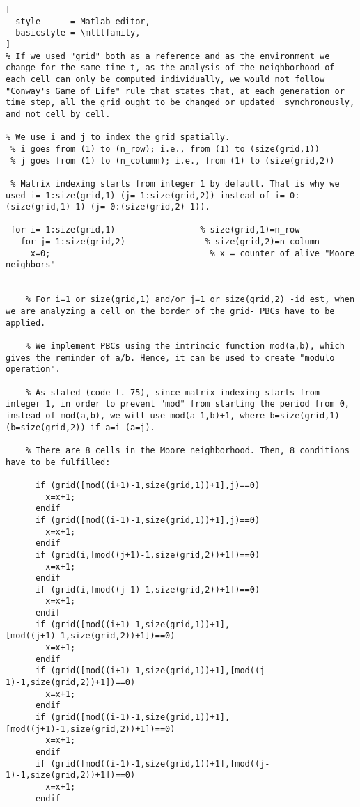 \documentclass[11pt]{article}
\numberwithin{equation}{section} %
\numberwithin{figure}{section} %
\begin{document}
\begin{appendices}
\begin{lstlisting}[
  style      = Matlab-editor,
  basicstyle = \mlttfamily,
]
% If we used "grid" both as a reference and as the environment we change for the same time t, as the analysis of the neighborhood of each cell can only be computed individually, we would not follow "Conway's Game of Life" rule that states that, at each generation or time step, all the grid ought to be changed or updated  synchronously, and not cell by cell.

% We use i and j to index the grid spatially.
 % i goes from (1) to (n_row); i.e., from (1) to (size(grid,1)) 
 % j goes from (1) to (n_column); i.e., from (1) to (size(grid,2))
 
 % Matrix indexing starts from integer 1 by default. That is why we used i= 1:size(grid,1) (j= 1:size(grid,2)) instead of i= 0:(size(grid,1)-1) (j= 0:(size(grid,2)-1)).

 for i= 1:size(grid,1)                 % size(grid,1)=n_row
   for j= 1:size(grid,2)                % size(grid,2)=n_column
     x=0;                                % x = counter of alive "Moore neighbors"
    
    
    % For i=1 or size(grid,1) and/or j=1 or size(grid,2) -id est, when we are analyzing a cell on the border of the grid- PBCs have to be applied.
    
    % We implement PBCs using the intrincic function mod(a,b), which gives the reminder of a/b. Hence, it can be used to create "modulo operation".
    
    % As stated (code l. 75), since matrix indexing starts from integer 1, in order to prevent "mod" from starting the period from 0, instead of mod(a,b), we will use mod(a-1,b)+1, where b=size(grid,1) (b=size(grid,2)) if a=i (a=j).
  
    % There are 8 cells in the Moore neighborhood. Then, 8 conditions have to be fulfilled:
  
      if (grid([mod((i+1)-1,size(grid,1))+1],j)==0)      
        x=x+1;                                           
      endif
      if (grid([mod((i-1)-1,size(grid,1))+1],j)==0)
        x=x+1;
      endif
      if (grid(i,[mod((j+1)-1,size(grid,2))+1])==0)   
        x=x+1;
      endif
      if (grid(i,[mod((j-1)-1,size(grid,2))+1])==0)   
        x=x+1;
      endif
      if (grid([mod((i+1)-1,size(grid,1))+1],[mod((j+1)-1,size(grid,2))+1])==0)
        x=x+1;
      endif
      if (grid([mod((i+1)-1,size(grid,1))+1],[mod((j-1)-1,size(grid,2))+1])==0)    
        x=x+1;
      endif
      if (grid([mod((i-1)-1,size(grid,1))+1],[mod((j+1)-1,size(grid,2))+1])==0)   
        x=x+1;
      endif
      if (grid([mod((i-1)-1,size(grid,1))+1],[mod((j-1)-1,size(grid,2))+1])==0)
        x=x+1;
      endif


\end{lstlisting}
\end{appendices}
\end{document}
